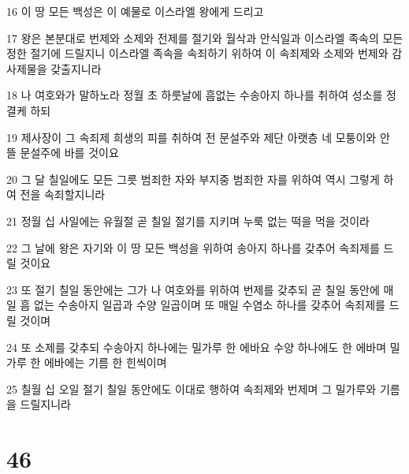 \par 16 이 땅 모든 백성은 이 예물로 이스라엘 왕에게 드리고
\par 17 왕은 본분대로 번제와 소제와 전제를 절기와 월삭과 안식일과 이스라엘 족속의 모든 정한 절기에 드릴지니 이스라엘 족속을 속죄하기 위하여 이 속죄제와 소제와 번제와 감사제물을 갖출지니라
\par 18 나 여호와가 말하노라 정월 초 하룻날에 흠없는 수송아지 하나를 취하여 성소를 정결케 하되
\par 19 제사장이 그 속죄제 희생의 피를 취하여 전 문설주와 제단 아랫층 네 모퉁이와 안 뜰 문설주에 바를 것이요
\par 20 그 달 칠일에도 모든 그릇 범죄한 자와 부지중 범죄한 자를 위하여 역시 그렇게 하여 전을 속죄할지니라
\par 21 정월 십 사일에는 유월절 곧 칠일 절기를 지키며 누룩 없는 떡을 먹을 것이라
\par 22 그 날에 왕은 자기와 이 땅 모든 백성을 위하여 송아지 하나를 갖추어 속죄제를 드릴 것이요
\par 23 또 절기 칠일 동안에는 그가 나 여호와를 위하여 번제를 갖추되 곧 칠일 동안에 매일 흠 없는 수송아지 일곱과 수양 일곱이며 또 매일 수염소 하나를 갖추어 속죄제를 드릴 것이며
\par 24 또 소제를 갖추되 수송아지 하나에는 밀가루 한 에바요 수양 하나에도 한 에바며 밀가루 한 에바에는 기름 한 힌씩이며
\par 25 칠월 십 오일 절기 칠일 동안에도 이대로 행하여 속죄제와 번제며 그 밀가루와 기름을 드릴지니라

\chapter{46}

